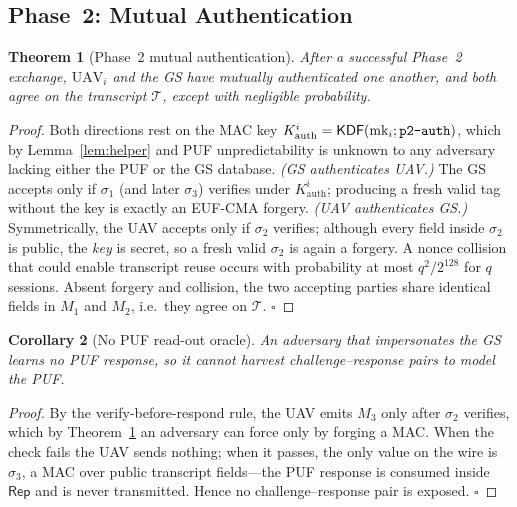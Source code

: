 \documentclass[11pt,a4paper]{article}
\newtheorem{theorem}{Theorem}
\newtheorem{corollary}[theorem]{Corollary}
\begin{document}
\subsection{Phase~2: Mutual Authentication}

\begin{theorem}[Phase~2 mutual authentication]
\label{thm:mutual_auth}
After a successful Phase~2 exchange, $\text{UAV}_i$ and the GS have mutually
authenticated one another, and both agree on the transcript $\mathcal{T}$,
except with negligible probability.
\end{theorem}

\begin{proof}
Both directions rest on the MAC key $K^{i}_{\text{auth}}=\mathsf{KDF}(\text{mk}_i;\texttt{p2\text{-}auth})$,
which by Lemma~\ref{lem:helper} and PUF unpredictability is unknown to any
adversary lacking either the PUF or the GS database.
\emph{(GS authenticates UAV.)} The GS accepts only if $\sigma_1$ (and later
$\sigma_3$) verifies under $K^{i}_{\text{auth}}$; producing a fresh valid tag
without the key is exactly an EUF-CMA forgery.
\emph{(UAV authenticates GS.)} Symmetrically, the UAV accepts only if $\sigma_2$
verifies; although every field inside $\sigma_2$ is public, the \emph{key} is
secret, so a fresh valid $\sigma_2$ is again a forgery.
A nonce collision that could enable transcript reuse occurs with probability at
most $q^2/2^{128}$ for $q$ sessions. Absent forgery and collision, the two
accepting parties share identical fields in $M_1$ and $M_2$, i.e.\ they agree on
$\mathcal{T}$. \hfill$\square$
\end{proof}

\begin{corollary}[No PUF read-out oracle]
\label{cor:oracle}
An adversary that impersonates the GS learns no PUF response, so it cannot
harvest challenge--response pairs to model the PUF.
\end{corollary}

\begin{proof}
By the verify-before-respond rule, the UAV emits $M_3$ only after $\sigma_2$
verifies, which by Theorem~\ref{thm:mutual_auth} an adversary can force only by
forging a MAC. When the check fails the UAV sends nothing; when it passes, the
only value on the wire is $\sigma_3$, a MAC over public transcript fields---the
PUF response is consumed inside $\mathsf{Rep}$ and is never transmitted. Hence
no challenge--response pair is exposed. \hfill$\square$
\end{proof}
\end{document}
